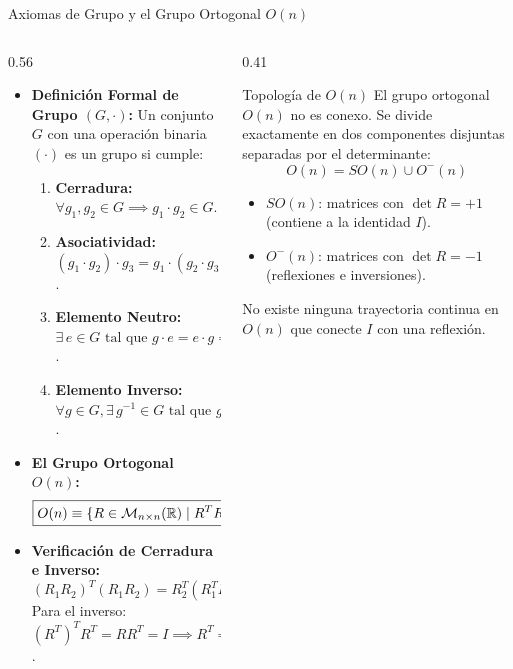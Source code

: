 \documentclass[10pt,aspectratio=169]{beamer}
\begin{document}
\begin{frame}{Axiomas de Grupo y el Grupo Ortogonal $O(n)$}
  \begin{columns}[c]
    \begin{column}{0.56\textwidth}
      \footnotesize
      \begin{itemize}\itemsep2pt
        \item \textbf{Definición Formal de Grupo $(G, \cdot)$:}
        Un conjunto $G$ con una operación binaria $(\cdot)$ es un grupo si cumple:
        \begin{enumerate}\scriptsize\itemsep2pt
          \item \textbf{Cerradura:} $\forall g_1, g_2 \in G \implies g_1 \cdot g_2 \in G$.
          \item \textbf{Asociatividad:} $(g_1 \cdot g_2) \cdot g_3 = g_1 \cdot (g_2 \cdot g_3)$.
          \item \textbf{Elemento Neutro:} $\exists\, e \in G \text{ tal que } g \cdot e = e \cdot g = g$.
          \item \textbf{Elemento Inverso:} $\forall g \in G, \exists\, g^{-1} \in G \text{ tal que } g \cdot g^{-1} = e$.
        \end{enumerate}
        \item \textbf{El Grupo Ortogonal $O(n)$:}
        \[
        \boxed{O(n) \equiv \{R \in \mathcal{M}_{n\times n}(\mathbb{R}) \mid R^T R = I\}}
        \]
        \item \textbf{Verificación de Cerradura e Inverso:}
        \[
        (R_1 R_2)^T (R_1 R_2) = R_2^T (R_1^T R_1) R_2 = R_2^T I R_2 = I.
        \]
        Para el inverso: $(R^T)^T R^T = R R^T = I \implies R^T = R^{-1} \in O(n)$.
      \end{itemize}
    \end{column}
    \begin{column}{0.41\textwidth}
      \footnotesize
      \begin{block}{Topología de $O(n)$}
        \scriptsize
        El grupo ortogonal $O(n)$ no es conexo. Se divide exactamente en dos componentes disjuntas separadas por el determinante:
        \[
        O(n) = SO(n) \cup O^-(n)
        \]
        \begin{itemize}\itemsep2pt
          \item $SO(n)$: matrices con $\det R = +1$ (contiene a la identidad $I$).
          \item $O^-(n)$: matrices con $\det R = -1$ (reflexiones e inversiones).
        \end{itemize}
        No existe ninguna trayectoria continua en $O(n)$ que conecte $I$ con una reflexión.
      \end{block}
    \end{column}
  \end{columns}
\end{frame}
\end{document}
